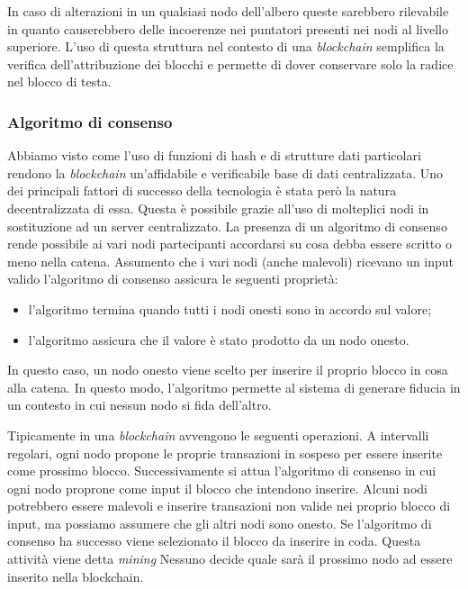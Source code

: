 In caso di alterazioni in un qualsiasi nodo dell'albero queste sarebbero rilevabile in quanto causerebbero delle incoerenze nei puntatori presenti nei nodi al livello superiore. L'uso di questa struttura nel contesto di una \emph{blockchain} semplifica la verifica dell'attribuzione dei blocchi e permette di dover conservare solo la radice nel blocco di testa.

\subsubsection{Algoritmo di consenso}
\label{cap:alg-cons}
Abbiamo visto come l'uso di funzioni di hash e di strutture dati particolari rendono la \emph{blockchain} un'affidabile e verificabile base di dati centralizzata. Uno dei principali fattori di successo della tecnologia è stata però la natura decentralizzata di essa. Questa è possibile grazie all'uso di molteplici nodi in sostituzione ad un server centralizzato. La presenza di un algoritmo di consenso rende possibile ai vari nodi partecipanti accordarsi su cosa debba essere scritto o meno nella catena. Assumento che i vari nodi (anche malevoli) ricevano un input valido l'algoritmo di consenso assicura le seguenti proprietà:
\begin{itemize}
    \item l'algoritmo termina quando tutti i nodi onesti sono in accordo sul valore;
    \item l'algoritmo assicura che il valore è stato prodotto da un nodo onesto. 
\end{itemize}

In questo caso, un nodo onesto viene scelto per inserire il proprio blocco in cosa alla catena. In questo modo, l'algoritmo permette al sistema di generare fiducia in un contesto in cui nessun nodo si fida dell'altro.

Tipicamente in una \emph{blockchain} avvengono le seguenti operazioni. A intervalli regolari, ogni nodo propone le proprie transazioni in sospeso per essere inserite come prossimo blocco. Successivamente si attua l'algoritmo di consenso in cui ogni nodo proprone come input il blocco che intendono inserire. Alcuni nodi potrebbero essere malevoli e inserire transazioni non valide nei proprio blocco di input, ma possiamo assumere che gli altri nodi sono onesto. Se l'algoritmo di consenso ha successo viene selezionato il blocco da inserire in coda. Questa attività viene detta \emph{mining}
Nessuno decide quale sarà il prossimo nodo ad essere inserito nella blockchain.

